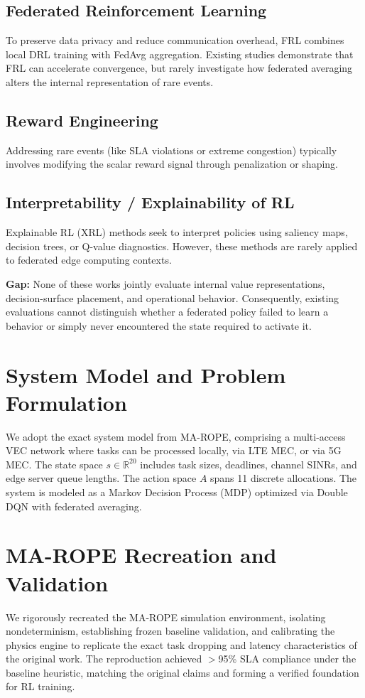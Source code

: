 \documentclass[conference]{IEEEtran}
\begin{document}
\subsection{Federated Reinforcement Learning}
To preserve data privacy and reduce communication overhead, FRL combines local DRL training with FedAvg aggregation. Existing studies demonstrate that FRL can accelerate convergence, but rarely investigate how federated averaging alters the internal representation of rare events.

\subsection{Reward Engineering}
Addressing rare events (like SLA violations or extreme congestion) typically involves modifying the scalar reward signal through penalization or shaping.

\subsection{Interpretability / Explainability of RL}
Explainable RL (XRL) methods seek to interpret policies using saliency maps, decision trees, or Q-value diagnostics. However, these methods are rarely applied to federated edge computing contexts.

\textbf{Gap:} None of these works jointly evaluate internal value representations, decision-surface placement, and operational behavior. Consequently, existing evaluations cannot distinguish whether a federated policy failed to learn a behavior or simply never encountered the state required to activate it.

\section{System Model and Problem Formulation}
We adopt the exact system model from MA-ROPE, comprising a multi-access VEC network where tasks can be processed locally, via LTE MEC, or via 5G MEC. The state space $s \in \mathbb{R}^{20}$ includes task sizes, deadlines, channel SINRs, and edge server queue lengths. The action space $A$ spans 11 discrete allocations. The system is modeled as a Markov Decision Process (MDP) optimized via Double DQN with federated averaging.

\section{MA-ROPE Recreation and Validation}
We rigorously recreated the MA-ROPE simulation environment, isolating nondeterminism, establishing frozen baseline validation, and calibrating the physics engine to replicate the exact task dropping and latency characteristics of the original work. The reproduction achieved $>$95\% SLA compliance under the baseline heuristic, matching the original claims and forming a verified foundation for RL training.
\end{document}
